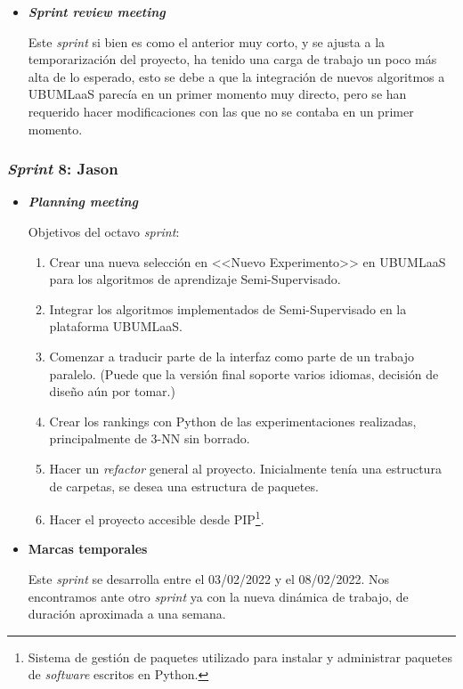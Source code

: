 \begin{itemize}
\item \textbf{\textit{Sprint review meeting}}

Este \textit{sprint} si bien es como el anterior muy corto, y se ajusta a la temporarización del proyecto, ha tenido una carga de trabajo un poco más alta de lo esperado, esto se debe a que la integración de nuevos algoritmos a UBUMLaaS parecía en un primer momento muy directo, pero se han requerido hacer modificaciones con las que no se contaba en un primer momento.

\end{itemize}

\subsubsection{\textit{Sprint} 8: Jason}
\begin{itemize}
\item \textbf{\textit{Planning meeting}}

Objetivos del octavo \textit{sprint}:
\begin{enumerate}
\item Crear una nueva selección en <<Nuevo Experimento>> en UBUMLaaS para los algoritmos de aprendizaje Semi-Supervisado.
\item Integrar los algoritmos implementados de Semi-Supervisado en la plataforma UBUMLaaS.
\item Comenzar a traducir parte de la interfaz como parte de un trabajo paralelo. (Puede que la versión final soporte varios idiomas, decisión de diseño aún por tomar.)
\item Crear los rankings con Python de las experimentaciones realizadas, principalmente de 3-NN sin borrado.
\item Hacer un \textit{refactor} general al proyecto. Inicialmente tenía una estructura de carpetas, se desea una estructura de paquetes.
\item Hacer el proyecto accesible desde PIP\footnote{Sistema de gestión de paquetes utilizado para instalar y administrar paquetes de \textit{software} escritos en Python.}.
\end{enumerate}
\item \textbf{Marcas temporales}

Este \textit{sprint} se desarrolla entre el 03/02/2022 y el 08/02/2022. Nos encontramos ante otro \textit{sprint} ya con la nueva dinámica de trabajo, de duración aproximada a una semana.


\end{itemize}
